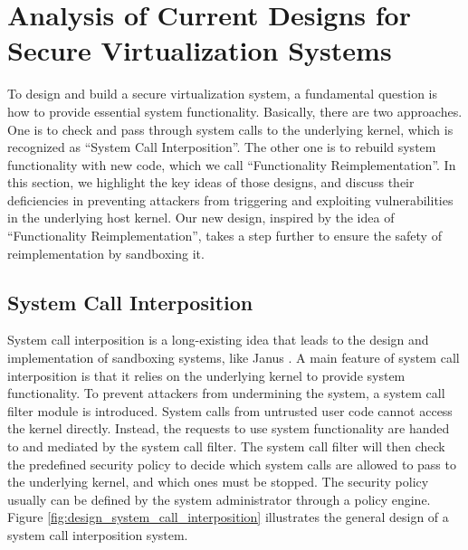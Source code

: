 \section{Analysis of Current Designs for Secure Virtualization Systems}
\label{sec.design}


To design and build a secure virtualization system, a fundamental question is 
how to provide essential system functionality. 
Basically, there are two approaches. 
One is to check and pass through system calls to the underlying kernel, 
which is recognized as ``System Call Interposition''. 
The other one is to rebuild system functionality with new code, 
which we call ``Functionality Reimplementation''. 
In this section, we highlight the key ideas of those designs, and discuss their deficiencies in 
preventing attackers from triggering and exploiting vulnerabilities in the underlying host kernel. 
Our new design, inspired by the idea of ``Functionality Reimplementation'', takes a step further 
to ensure the safety of reimplementation by sandboxing it.  

\subsection{System Call Interposition}
System call interposition is a long-existing idea that leads to the design and implementation of 
sandboxing systems, like Janus \cite{Janus0:96, Janus:99}. 
A main feature of system call interposition is that it relies on the underlying kernel to provide 
system functionality. To prevent attackers from undermining the system, a system call filter module 
is introduced. System calls from untrusted user code cannot access the kernel directly. Instead, the 
requests to use system functionality are handed to and mediated by the system call filter. 
The system call filter will then check the predefined security policy to decide which system calls are 
allowed to pass to the underlying kernel, and which ones must be stopped. The security policy usually 
can be defined by the system administrator through a policy engine. 
Figure \ref{fig:design_system_call_interposition} illustrates the general design of a system call interposition system. 

